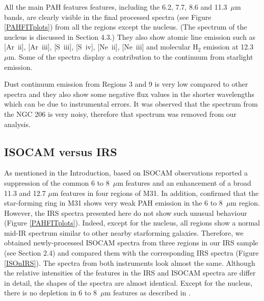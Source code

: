 All the main PAH features features, including the 6.2, 7.7, 8.6 and 11.3~$\mu$m bands, are clearly visible in the final processed spectra 
(see Figure \ref{PAHFITplots}) from all the regions except the nucleus. (The spectrum of the nucleus is discussed in Section 4.3.)
They also show atomic line emission such as [Ar~{\sc ii}], [Ar~{\sc iii}], [S~{\sc iii}], [S~{\sc iv}], [Ne~{\sc ii}], [Ne~{\sc iii}] 
and molecular H$_{2}$ emission at 12.3~$\mu$m. Some of the spectra display a contribution to the continuum from starlight emission.

Dust continuum emission from Regions 3 and 9 is very low compared to other spectra and they also show some negative flux values in the shorter 
wavelengths which can be due to instrumental errors. It was observed that the spectrum from the NGC 206 is very noisy, therefore that spectrum 
was removed from our analysis. 


\subsection{ISOCAM versus IRS}
\label{sect:iso_vs_irs}


As mentioned in the Introduction, based on ISOCAM observations \citet{1998Cesarsky} reported a suppression of the common 
6 to 8~$\mu$m features and an enhancement of a broad 11.3 and 12.7 $\mu$m features in four regions of M31. 
In addition, \citet{Pagani_1999} confirmed that the star-forming ring in M31 shows very weak PAH emission in the 6 to 8~$\mu$m region. 
However, the IRS spectra presented here do not show such unusual behaviour (Figure \ref{PAHFITplots}). 
Indeed, except for the nucleus, all regions show a normal mid-IR spectrum similar to other nearby starforming galaxies. 
Therefore, we obtained newly-processed ISOCAM spectra from three regions in our IRS sample (see Section 2.4) 
and compared them with the corresponding IRS spectra (Figure \ref{ISOnIRS}). 
The spectra from both instruments look almost the same. Although the relative intensities of the features in the IRS and ISOCAM 
spectra are differ in detail, the shapes of the spectra are almost identical. Except for the nucleus, there is no depletion in 
6 to 8~$\mu$m features as described in \citet{1998Cesarsky}. 
	
